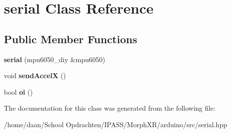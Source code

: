 \hypertarget{classserial}{}\section{serial Class Reference}
\label{classserial}
\subsection*{Public Member Functions}
\begin{DoxyCompactItemize}
\item 
\mbox{\label{classserial_a6d54658490b9c96acac8f71347c2bf93}} 
{\bfseries serial} (mpu6050\+\_\+diy \&mpu6050)
\item 
\mbox{\label{classserial_a8c9ba3a066b541f4ec38b4c121db93a8}} 
void {\bfseries send\+AccelX} ()
\item 
\mbox{\label{classserial_aaa106874a548297c206b6ec5d81dd296}} 
bool {\bfseries oi} ()
\end{DoxyCompactItemize}


The documentation for this class was generated from the following file\+:\begin{DoxyCompactItemize}
\item 
/home/daan/\+School Opdrachten/\+I\+P\+A\+S\+S/\+Morph\+X\+R/arduino/src/serial.\+hpp\end{DoxyCompactItemize}
